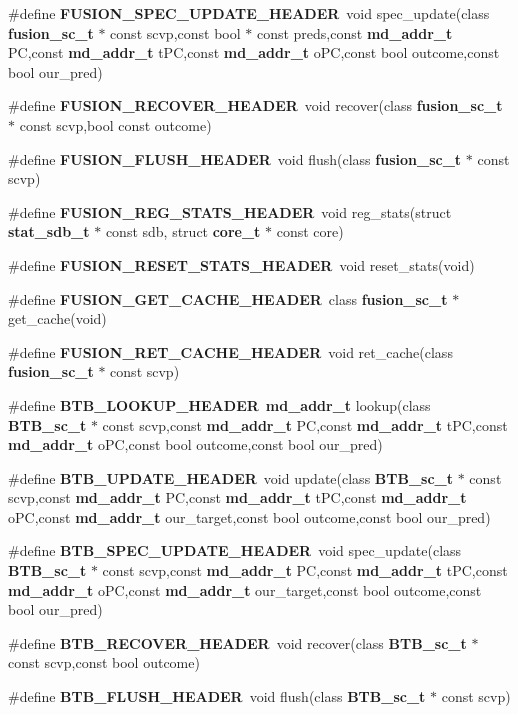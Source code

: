 \begin{CompactItemize}
\item 
\#define {\bf FUSION\_\-SPEC\_\-UPDATE\_\-HEADER}~void spec\_\-update(class {\bf fusion\_\-sc\_\-t} $\ast$ const scvp,const bool $\ast$ const preds,const {\bf md\_\-addr\_\-t} PC,const {\bf md\_\-addr\_\-t} tPC,const {\bf md\_\-addr\_\-t} oPC,const bool outcome,const bool our\_\-pred)
\item 
\#define {\bf FUSION\_\-RECOVER\_\-HEADER}~void recover(class {\bf fusion\_\-sc\_\-t} $\ast$ const scvp,bool const outcome)
\item 
\#define {\bf FUSION\_\-FLUSH\_\-HEADER}~void flush(class {\bf fusion\_\-sc\_\-t} $\ast$ const scvp)
\item 
\#define {\bf FUSION\_\-REG\_\-STATS\_\-HEADER}~void reg\_\-stats(struct {\bf stat\_\-sdb\_\-t} $\ast$ const sdb, struct {\bf core\_\-t} $\ast$ const core)
\item 
\#define {\bf FUSION\_\-RESET\_\-STATS\_\-HEADER}~void reset\_\-stats(void)
\item 
\#define {\bf FUSION\_\-GET\_\-CACHE\_\-HEADER}~class {\bf fusion\_\-sc\_\-t} $\ast$ get\_\-cache(void)
\item 
\#define {\bf FUSION\_\-RET\_\-CACHE\_\-HEADER}~void ret\_\-cache(class {\bf fusion\_\-sc\_\-t} $\ast$ const scvp)
\item 
\#define {\bf BTB\_\-LOOKUP\_\-HEADER}~{\bf md\_\-addr\_\-t} lookup(class {\bf BTB\_\-sc\_\-t} $\ast$ const scvp,const {\bf md\_\-addr\_\-t} PC,const {\bf md\_\-addr\_\-t} tPC,const {\bf md\_\-addr\_\-t} oPC,const bool outcome,const bool our\_\-pred)
\item 
\#define {\bf BTB\_\-UPDATE\_\-HEADER}~void update(class {\bf BTB\_\-sc\_\-t} $\ast$ const scvp,const {\bf md\_\-addr\_\-t} PC,const {\bf md\_\-addr\_\-t} tPC,const {\bf md\_\-addr\_\-t} oPC,const {\bf md\_\-addr\_\-t} our\_\-target,const bool outcome,const bool our\_\-pred)
\item 
\#define {\bf BTB\_\-SPEC\_\-UPDATE\_\-HEADER}~void spec\_\-update(class {\bf BTB\_\-sc\_\-t} $\ast$ const scvp,const {\bf md\_\-addr\_\-t} PC,const {\bf md\_\-addr\_\-t} tPC,const {\bf md\_\-addr\_\-t} oPC,const {\bf md\_\-addr\_\-t} our\_\-target,const bool outcome,const bool our\_\-pred)
\item 
\#define {\bf BTB\_\-RECOVER\_\-HEADER}~void recover(class {\bf BTB\_\-sc\_\-t} $\ast$ const scvp,const bool outcome)
\item 
\#define {\bf BTB\_\-FLUSH\_\-HEADER}~void flush(class {\bf BTB\_\-sc\_\-t} $\ast$ const scvp)
\item 

\end{CompactItemize}
